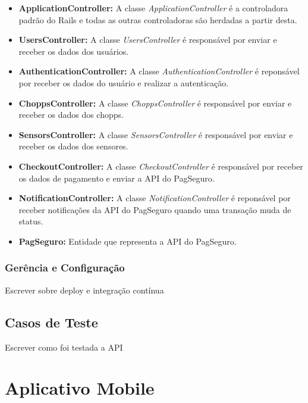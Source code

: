 \begin{itemize}
    \item \textbf{ApplicationController:} A classe \textit{ApplicationController} é a controladora padrão do Rails
    e todas as outras controladoras são herdadas a partir desta.
    \item \textbf{UsersController:} A classe \textit{UsersController} é responsável por enviar e receber os dados dos usuários.
    \item \textbf{AuthenticationController:} A classe \textit{AuthenticationController} é reponsável por receber os dados do usuário
    e realizar a autenticação.
    \item \textbf{ChoppsController:} A classe \textit{ChoppsController} é responsável por enviar e receber os dados dos chopps.
    \item \textbf{SensorsController:} A classe \textit{SensorsController} é responsável por enviar e receber os dados dos sensores.
    \item \textbf{CheckoutController:} A classe \textit{CheckoutController} é responsável por receber os dados de pagamento e enviar
    a API do PagSeguro.
    \item \textbf{NotificationController:} A classe \textit{NotificationController} é reponsável por receber notificações da API
    do PagSeguro quando uma transação muda de status.
    \item \textbf{PagSeguro:} Entidade que representa a API do PagSeguro.
\end{itemize}

\subsubsection{Gerência e Configuração}

Escrever sobre deploy e integração contínua


\subsection{Casos de Teste}

Escrever como foi testada a API

\section[Aplicativo Mobile]{Aplicativo Mobile}

